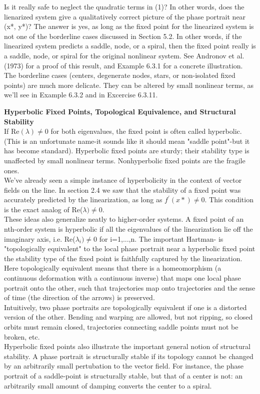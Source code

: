 \documentclass{article}
\newcommand\tab[1][1cm]{\hspace*{#1}}
\begin{document}
Is it really safe to neglect the quadratic terms in (1)? In other words, does the lienarized system give a qualitatively correct picture of the phase portrait near (x*, y*)? The answer is yes, as long as the fixed point for the linearized system is not one of the borderline cases discussed in Section 5.2. In other words, if the linearized system predicts a saddle, node, or a spiral, then the fixed point really is a saddle, node, or spiral for the original nonlinear system. See Andronov et al. (1973) for a proof of this result, and Example 6.3.1 for a concrete illustration. \\
\tab The borderline cases (centers, degenerate nodes, stars, or non-isolated fixed points) are much more delicate. They can be altered by small nonlinear terms, as we'll see in Example 6.3.2 and in Excercise 6.3.11. \\ \tab

\textbf {Hyperbolic Fixed Points, Topological Equivalence, and Structural Stability} \\ \tab
If Re$(\lambda) \neq 0$ for both eigenvalues, the fixed point is often called hyperbolic. (This is an unfortunate name-it sounds like it should mean "saddle point"-but it has become standard). Hyperbolic fixed points are sturdy; their stability type is unaffected by small nonlinear terms. Nonhyperbolic fixed points are the fragile ones. \\ \tab
We've already seen a simple instance of hyperbolicity in the context of vector fields on the line. In section 2.4 we saw that the stability of a fixed point was accurately predicted by the linearization, as long as $f^{'}(x*)\neq 0$. This condition is the exact analog of Re($\lambda) \neq 0$. \\ \tab
These ideas also generalize neatly to higher-order systems. A fixed point of an nth-order system is hyperbolic if all the eigenvalues of the linearization lie off the imaginary axis, i.e. Re($\lambda_{i})\neq 0$ for i=1,...,n. The important Hartman- is "topologically equivalent" to the local phase portrait near a hyperbolic fixed point the stability type of the fixed point is faithfully captured by the linearization. Here topologically equivalent means that there is a homeomorphism (a continuous deformation with a continuous inverse) that maps one local phase portrait onto the other, such that trajectories map onto trajectories and the sense of time (the direction of the arrows) is preserved. \\ \tab
Intuitively, two phase portraits are topologically equivalent if one is a distorted version of the other. Bending and warping are allowed, but not ripping, so closed orbits must remain closed, trajectories connecting saddle points must not be broken, etc. \\ \tab
Hyperbolic fixed points also illustrate the important general notion of structural stability. A phase portrait is structurally stable if its topology cannot be changed by an arbitrarily small pertubation to the vector field. For instance, the phase portrait of a saddle-point is structurally stable, but that of a center is not: an arbitrarily small amount of damping converts the center to a spiral. \\ \tab
\end{document}
